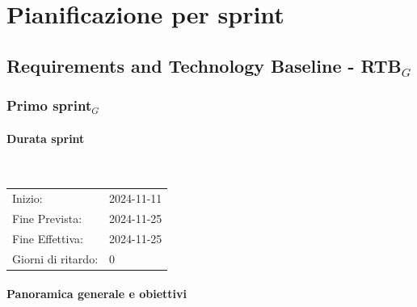 \documentclass[10pt]{article}
\begin{document}
{\newpage


\section{Pianificazione per sprint}
\label{pianificazione}

\subsection{Requirements and Technology Baseline - RTB$_G$}


\subsubsection{Primo sprint$_G$}
\label{primo-sprint$_G$}
    
    \paragraph{Durata sprint}\mbox{}\\
    \vspace{-1.5em}
    \begin{table}[h] 
    \renewcommand{\arraystretch}{1.2}  
    \begin{tabular}{ l l }
        Inizio: & 2024-11-11 \\
        Fine Prevista: & 2024-11-25 \\
        Fine Effettiva: & 2024-11-25 \\
        Giorni di ritardo: & 0 \\
    \end{tabular}
    \end{table}
    \vspace{-2em}
    {\renewcommand{\arraystretch}{1.5}%
    
    \paragraph{Panoramica generale e obiettivi}\mbox{}\vspace{0.4em}
    
}}
\end{document}
